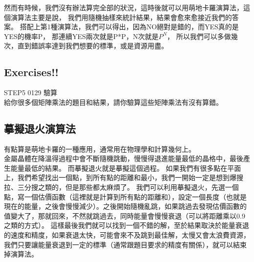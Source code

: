 \documentclass{article}
\begin{document}
然而有時候，我們沒有辦法算完全部的狀況，這時後就可以用萌地卡羅演算法，這個演算法主要是說，
我們用隨機抽樣來統計結果，結果會愈來愈接近我們的答案。
搭配上第1種演算法，我們可以得出，因為NO絕對是錯的，而YES真的是YES的機率P，
那連續YES兩次就是P*P，N次就是$P^N$，
所以我們可以多做幾次，直到錯誤率達到我們想要的標準，或是資源用盡。
\subsection*{Exercises!!}
STEP5 0129 驗算\\
給你很多個矩陣乘法的題目和結果，請你驗算這些矩陣乘法有沒有算錯。


\subsection{摹擬退火演算法}
有點算是萌地卡羅的一種應用，通常用在物理學和計算幾何上。\\
金屬晶體在降溫得過程中會不斷隨機跳動，慢慢得退進能量最低的晶格中，最後產生能量最低的結果。
而摹擬退火就是摹擬這個過程。
如果我們有很多點在平面上，我們希望找出一個點，到所有點的距離和最小，我們一開始一定是想到爆搜拉、三分搜之類的，但是那些都太麻煩了。
我們可以利用摹擬退火，先選一個點，寫一個估價函數（這裡就是計算到所有點的距離和），設定一個長度（也就是現在的能量，之後會慢慢減少）。之後開始隨機亂跳，如果跳過去發現估價函數的值變大了，那就回來，不然就跳過去，同時能量會慢慢衰退（可以將距離乘以0.9之類的方式）。
這樣最後我們就可以找到一個不錯的解，至於結果取決於能量衰退的速度和精度，如果衰退太快，可能會來不及跳到最佳解，太慢又會太浪費資源，我們只要讓能量衰退到一定的標準（通常跟題目要求的精度有關係），就可以結束掉演算法。
\end{document}

